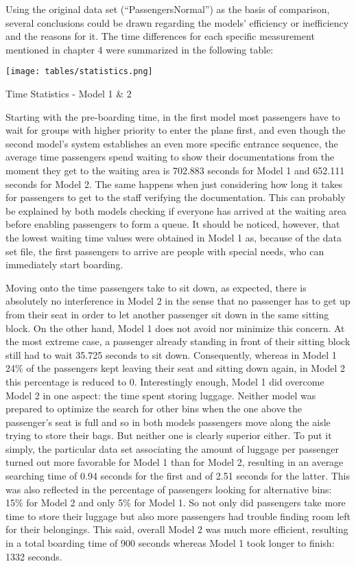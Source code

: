 Using the original data set (“PassengersNormal”) as the basis of comparison, several conclusions could be drawn regarding the models' efficiency or inefficiency and the reasons for it. The time differences for each specific measurement mentioned in chapter 4 were summarized in the following table:
\begin{table}[H]
  \texttt{[image: tables/statistics.png]}
  \caption{Time Statistics - Model 1 \& 2}
  \label{tbl:statistics}
\end{table}
Starting with the pre-boarding time, in the first model most passengers have to wait for groups with higher priority to enter the plane first, and even though the second model's system establishes an even more specific entrance sequence, the average time passengers spend waiting to show their documentations from the moment they get to the waiting area is 702.883 seconds for Model 1 and 652.111 seconds for Model 2. The same happens when just considering how long it takes for passengers to get to the staff verifying the documentation. This can probably be explained by both models checking if everyone has arrived at the waiting area before enabling passengers to form a queue. It should be noticed, however, that the lowest waiting time values were obtained in Model 1 as, because of the data set file, the first passengers to arrive are people with special needs, who can immediately start boarding.

\indent\newline
Moving onto the time passengers take to sit down, as expected, there is absolutely no interference in Model 2 in the sense that no passenger has to get up from their seat in order to let another passenger sit down in the same sitting block. On the other hand, Model 1 does not avoid nor minimize this concern. At the most extreme case, a passenger already standing in front of their sitting block still had to wait 35.725 seconds to sit down. Consequently, whereas in Model 1 24\% of the passengers kept leaving their seat and sitting down again, in Model 2 this percentage is reduced to 0.
Interestingly enough, Model 1 did overcome Model 2 in one aspect: the time spent storing luggage. Neither model was prepared to optimize the search for other bins when the one above the passenger's seat is full and so in both models passengers move along the aisle trying to store their bags. But neither one is clearly superior either. To put it simply, the particular data set associating the amount of luggage per passenger turned out more favorable for Model 1 than for Model 2, resulting in an average searching time of 0.94 seconds for the first and of 2.51 seconds for the latter. This was also reflected in the percentage of passengers looking for alternative bins: 15\% for Model 2 and only 5\% for Model 1. So not only did passengers take more time to store their luggage but also more passengers had trouble finding room left for their belongings.
\indent\newline
This said, overall Model 2 was much more efficient, resulting in a total boarding time of 900 seconds whereas Model 1 took longer to finish: 1332 seconds.
